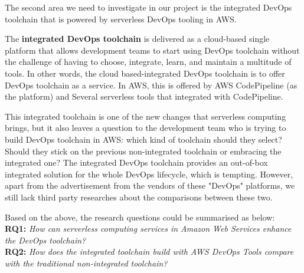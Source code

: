 \par
The second area we need to investigate in our project is the integrated DevOps toolchain that is powered by serverless DevOps tooling in AWS. 
\par
The \textbf{integrated DevOps toolchain} is delivered as a cloud-based single platform that allows development teams to start using DevOps toolchain without the challenge of having to choose, integrate, learn, and maintain a multitude of tools. In other words, the cloud based-integrated DevOps toolchain is to offer DevOps toolchain as a service.
In AWS, this is offered by AWS CodePipeline (as the platform) and Several serverless tools that integrated with CodePipeline.
\par
This integrated toolchain is one of the new changes that serverless computing brings, but it also leaves a question to the development team who is trying to build DevOps toolchain in AWS: which kind of toolchain should they select? Should they stick on the previous non-integrated toolchain or embracing the integrated one? The integrated DevOps toolchain provides an out-of-box integrated solution for the whole DevOps lifecycle, which is tempting. However, apart from the advertisement from the vendors of these "DevOps" platforms, we still lack third party researches about the comparisons between these two. 
\par
Based on the above, the research questions could be summarised as below: \\
\textbf{RQ1:} \textit{How can serverless computing services in Amazon Web Services enhance the DevOps toolchain?} \\
\textbf{RQ2:} \textit{How does the integrated toolchain build with AWS DevOps Tools compare with the traditional non-integrated toolchain?}
